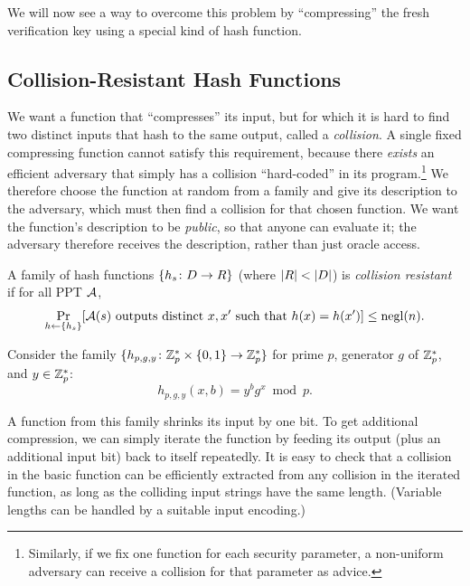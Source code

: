 \documentclass[11pt]{article}
\begin{document}
We will now see a way to overcome this problem by ``compressing'' the
fresh verification key using a special kind of hash function.

\subsection{Collision-Resistant Hash Functions}
\label{sec:coll-resist-hash}

We want a function that ``compresses'' its input, but for which it is hard to find two distinct inputs that hash to the same output, called a \emph{collision}.
A single fixed compressing function cannot satisfy this requirement, because there \emph{exists} an efficient adversary that simply has a collision ``hard-coded'' in its program.\footnote{Similarly, if we fix one function for each security parameter, a non-uniform adversary can receive a collision for that parameter as advice.}
We therefore choose the function at random from a family and give its description to the adversary, which must then find a collision for that chosen function.
We want the function's description to be \emph{public}, so that anyone can evaluate it; the adversary therefore receives the description, rather than just oracle access.

\begin{definition}
  A family of hash functions $\{h_s \colon D \to R\}$ (where $\lvert R\rvert < \lvert D\rvert$) is \emph{collision resistant} if for all PPT $\mathcal{A}$,
  \[ \Pr_{h \gets \{ h_s \}} [\mathcal{A}(s) \text{ outputs distinct } x, x' \text{ such that } h(x) = h(x')] \leq \operatorname{negl}(n).
  \]
\end{definition}

\begin{example}
  Consider the family $\{h_{p,g,y} \colon \mathbb{Z}_p^{*} \times \{0,1\} \to \mathbb{Z}_p^{*}\}$ for prime $p$, generator $g$ of $\mathbb{Z}_p^*$, and $y \in \mathbb{Z}_p^*$: \[h_{p,g,y}(x,b) = y^b g^x \bmod p.
  \]
\end{example}

A function from this family shrinks its input by one bit.
To get additional compression, we can simply iterate the function by feeding its output (plus an additional input bit) back to itself repeatedly.
It is easy to check that a collision in the basic function can be efficiently extracted from any collision in the iterated function, as long as the colliding input strings have the same length.
(Variable lengths can be handled by a suitable input encoding.)
\end{document}
